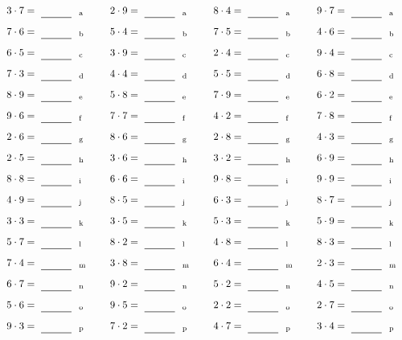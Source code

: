 \documentclass
[
  draft    = true,
  fontsize = 11pt,
  parskip  = half-
]
{scrartcl}
\begin{document}
\par\vfill\par
\begin{align*}
    \pline{3\cdot7}&=\rline{a}
  & \pline{2\cdot9}&=\rline{a}
  & \pline{8\cdot4}&=\rline{a}
  & \pline{9\cdot7}&=\rline{a} \\[1ex]
    \pline{7\cdot6}&=\rline{b}
  & \pline{5\cdot4}&=\rline{b}
  & \pline{7\cdot5}&=\rline{b}
  & \pline{4\cdot6}&=\rline{b} \\[1ex]
    \pline{6\cdot5}&=\rline{c}
  & \pline{3\cdot9}&=\rline{c}
  & \pline{2\cdot4}&=\rline{c}
  & \pline{9\cdot4}&=\rline{c} \\[1ex]
    \pline{7\cdot3}&=\rline{d}
  & \pline{4\cdot4}&=\rline{d}
  & \pline{5\cdot5}&=\rline{d}
  & \pline{6\cdot8}&=\rline{d} \\[1ex]
    \pline{8\cdot9}&=\rline{e}
  & \pline{5\cdot8}&=\rline{e}
  & \pline{7\cdot9}&=\rline{e}
  & \pline{6\cdot2}&=\rline{e} \\[1ex]
    \pline{9\cdot6}&=\rline{f}
  & \pline{7\cdot7}&=\rline{f}
  & \pline{4\cdot2}&=\rline{f}
  & \pline{7\cdot8}&=\rline{f} \\[1ex]
    \pline{2\cdot6}&=\rline{g}
  & \pline{8\cdot6}&=\rline{g}
  & \pline{2\cdot8}&=\rline{g}
  & \pline{4\cdot3}&=\rline{g} \\[1ex]
    \pline{2\cdot5}&=\rline{h}
  & \pline{3\cdot6}&=\rline{h}
  & \pline{3\cdot2}&=\rline{h}
  & \pline{6\cdot9}&=\rline{h} \\[1ex]
    \pline{8\cdot8}&=\rline{i}
  & \pline{6\cdot6}&=\rline{i}
  & \pline{9\cdot8}&=\rline{i}
  & \pline{9\cdot9}&=\rline{i} \\[1ex]
    \pline{4\cdot9}&=\rline{j}
  & \pline{8\cdot5}&=\rline{j}
  & \pline{6\cdot3}&=\rline{j}
  & \pline{8\cdot7}&=\rline{j} \\[1ex]
    \pline{3\cdot3}&=\rline{k}
  & \pline{3\cdot5}&=\rline{k}
  & \pline{5\cdot3}&=\rline{k}
  & \pline{5\cdot9}&=\rline{k} \\[1ex]
    \pline{5\cdot7}&=\rline{l}
  & \pline{8\cdot2}&=\rline{l}
  & \pline{4\cdot8}&=\rline{l}
  & \pline{8\cdot3}&=\rline{l} \\[1ex]
    \pline{7\cdot4}&=\rline{m}
  & \pline{3\cdot8}&=\rline{m}
  & \pline{6\cdot4}&=\rline{m}
  & \pline{2\cdot3}&=\rline{m} \\[1ex]
    \pline{6\cdot7}&=\rline{n}
  & \pline{9\cdot2}&=\rline{n}
  & \pline{5\cdot2}&=\rline{n}
  & \pline{4\cdot5}&=\rline{n} \\[1ex]
    \pline{5\cdot6}&=\rline{o}
  & \pline{9\cdot5}&=\rline{o}
  & \pline{2\cdot2}&=\rline{o}
  & \pline{2\cdot7}&=\rline{o} \\[1ex]
    \pline{9\cdot3}&=\rline{p}
  & \pline{7\cdot2}&=\rline{p}
  & \pline{4\cdot7}&=\rline{p}
  & \pline{3\cdot4}&=\rline{p}
\end{align*}
\end{document}
